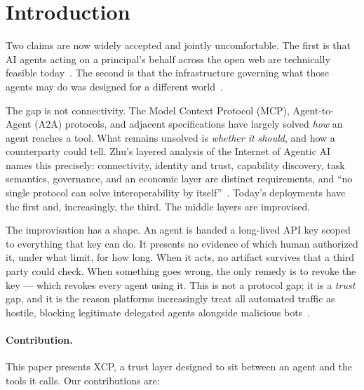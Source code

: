 \documentclass[11pt]{article}
\begin{document}
\section{Introduction}

Two claims are now widely accepted and jointly uncomfortable. The first is that
AI agents acting on a principal's behalf across the open web are technically
feasible today~\cite{pattison2026}. The second is that the infrastructure
governing what those agents may do was designed for a different
world~\cite{yang2025,zhu2026ioai}.

The gap is not connectivity. The Model Context Protocol (MCP), Agent-to-Agent
(A2A) protocols, and adjacent specifications have largely solved \emph{how} an
agent reaches a tool. What remains unsolved is \emph{whether it should}, and how
a counterparty could tell. Zhu's layered analysis of the Internet of Agentic
AI names this precisely: connectivity, identity and trust, capability discovery,
task semantics, governance, and an economic layer are distinct requirements, and
``no single protocol can solve interoperability by itself''~\cite{zhu2026ioai}.
Today's deployments have the first and, increasingly, the third. The middle
layers are improvised.

The improvisation has a shape. An agent is handed a long-lived API key scoped to
everything that key can do. It presents no evidence of which human authorized it,
under what limit, for how long. When it acts, no artifact survives that a third
party could check. When something goes wrong, the only remedy is to revoke the
key --- which revokes every agent using it. This is not a protocol gap; it is a
\emph{trust} gap, and it is the reason platforms increasingly treat all automated
traffic as hostile, blocking legitimate delegated agents alongside malicious
bots~\cite{pattison2026}.

\paragraph{Contribution.} This paper presents XCP, a trust layer designed to sit
between an agent and the tools it calls. Our contributions are:
\end{document}
